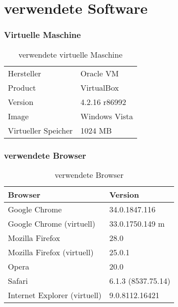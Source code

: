 	
	\section{verwendete Software}
	
	\subsubsection{Virtuelle Maschine}
	\begin{table}[H]
	 \vspace{-20pt}
 		\centering
			\begin{tabular}{| p{4cm} | p{8cm}  |}
			\hline
				Hersteller			&	Oracle VM\\
				Product			&	VirtualBox\\
				Version			&	4.2.16 r86992\\
				Image			&	Windows Vista\\
				Virtueller Speicher	&	1024 MB\\
				\hline
				\end{tabular}
			\caption{verwendete virtuelle Maschine}
	\end{table}
	
	\subsubsection{verwendete Browser}	
	\begin{table}[H]
	 \vspace{-20pt}
 		\centering
			\begin{tabular}{| p{8cm} | p{4cm}  |}
			\hline
				Browser		 	&	Version	\\
			\hline

			\hline
				Google Chrome			&	34.0.1847.116\\
				Google Chrome (virtuell)		&	33.0.1750.149 m\\
				Mozilla Firefox				&	28.0\\
				Mozilla Firefox (virtuell)		&	25.0.1\\
				Opera					&	20.0\\
				Safari					&	6.1.3 (8537.75.14)\\
				Internet Explorer (virtuell)		&	9.0.8112.16421\\
				\hline
				\end{tabular}
			\caption{verwendete Browser}
	\end{table}
	
	
	
